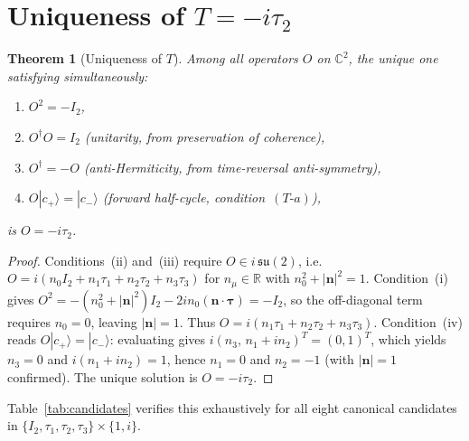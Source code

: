 \documentclass[11pt,a4paper]{article}
\newtheorem{theorem}{Theorem}[section]
\theoremstyle{definition}
\newcommand{\cplu}{|c_+\rangle}
\newcommand{\cmin}{|c_-\rangle}
\begin{document}
\section{Uniqueness of \texorpdfstring{$T = -i\tau_2$}{T = -i tau2}}
\label{sec:uniqueness}

\begin{theorem}[Uniqueness of $T$]
\label{thm:uniqueness}
Among all operators $O$ on $\mathbb{C}^2$, the unique one satisfying simultaneously:
\begin{enumerate}[label=(\roman*)]
\item $O^2 = -I_2$,
\item $O^\dagger O = I_2$ (unitarity, from preservation of coherence),
\item $O^\dagger = -O$ (anti-Hermiticity, from time-reversal anti-symmetry),
\item $O\cplu = \cmin$ (forward half-cycle, condition~$(T\textrm{-}a)$),
\end{enumerate}
is $O = -i\tau_2$.
\end{theorem}

\begin{proof}
Conditions~(ii) and~(iii) require $O \in i\,\mathfrak{su}(2)$, i.e.\ $O = i(n_0 I_2 + n_1\tau_1 + n_2\tau_2 + n_3\tau_3)$ for $n_\mu \in \mathbb{R}$ with $n_0^2 + |\mathbf{n}|^2 = 1$. Condition~(i) gives $O^2 = -(n_0^2 + |\mathbf{n}|^2)I_2 - 2in_0(\mathbf{n}\cdot\boldsymbol{\tau}) = -I_2$, so the off-diagonal term requires $n_0 = 0$, leaving $|\mathbf{n}| = 1$. Thus $O = i(n_1\tau_1 + n_2\tau_2 + n_3\tau_3)$. Condition~(iv) reads $O\cplu = \cmin$: evaluating gives $i(n_3,\, n_1 + in_2)^T = (0,1)^T$, which yields $n_3 = 0$ and $i(n_1 + in_2) = 1$, hence $n_1 = 0$ and $n_2 = -1$ (with $|\mathbf{n}|=1$ confirmed). The unique solution is $O = -i\tau_2$.
\end{proof}

Table~\ref{tab:candidates} verifies this exhaustively for all eight canonical candidates in $\{I_2, \tau_1, \tau_2, \tau_3\} \times \{1, i\}$.
\end{document}
